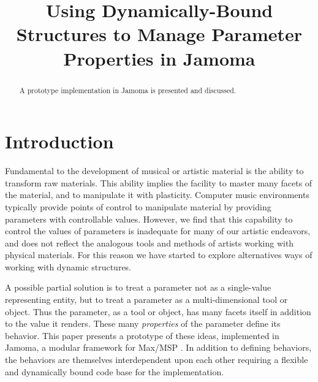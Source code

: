\documentclass{article}
\title{Using Dynamically-Bound Structures to Manage Parameter Properties in Jamoma}
\begin{document}
%
\maketitle
%

\begin{abstract}

A prototype implementation in Jamoma is presented and discussed.


\end{abstract}


\section{Introduction} %
\label{sec:introduction}

Fundamental to the development of musical or artistic material is the ability to transform raw materials.  This ability implies the facility to master many facets of the material, and to manipulate it with plasticity.  Computer music environments typically provide points of control to manipulate material by providing parameters with controllable values. However, we find that this capability to control the values of parameters is inadequate for many of our artistic endeavors, and does not reflect the analogous tools and methods of artists working with physical materials. For this reason we have started to explore alternatives ways of working with dynamic structures.

A possible partial solution is to treat a parameter not as a single-value representing entity, but to treat a parameter as a multi-dimensional tool or object.  Thus the parameter, as a tool or object, has many facets itself in addition to the value it renders.  These many \emph{properties} of the parameter define its behavior. This paper presents a prototype of these ideas, implemented in Jamoma, a modular framework for Max/MSP \cite{Place:2006}. In addition to defining behaviors, the behaviors are themselves interdependent upon each other requiring a flexible and dynamically bound code base for the implementation.
\end{document}
